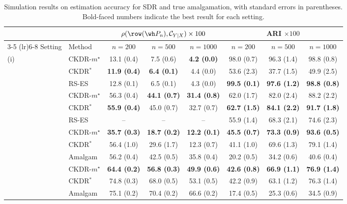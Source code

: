 \begin{table}[t]
    \centering
    \caption{Simulation results on estimation accuracy for SDR and true amalgamation, with standard errors in parentheses. Bold-faced numbers indicate the best result for each setting.}
    \label{tab:simulation-subspace}
    \begin{scriptsize}
    \begin{tabular*}{\columnwidth}{@{\extracolsep{\fill}}llcccccc}
    \toprule
     &  & \multicolumn{3}{c}{$\rho(\row(\wh P_n), \mathcal{C}_{Y|X}) \times 100$} & \multicolumn{3}{c}{ARI $\times 100$} \\
    \cmidrule(lr){3-5} \cmidrule(lr){6-8}
    Setting& Method & $n=200$ & $n=500$ & $n=1000$ & $n=200$ & $n=500$ & $n=1000$ \\
    \midrule
     \multirow{3}{*}{(i)} & CKDR-$m^\star$ & 13.1 (0.4) & 7.5 (0.6) & \textbf{4.2 (0.0)} & 98.0 (0.7) & 96.3 (1.4) & 98.8 (0.8) \\
      & CKDR$^*$ & \textbf{11.9 (0.4)} & \textbf{6.4 (0.1)} & 4.4 (0.0) & 53.6 (2.3) & 37.7 (1.5) & 49.9 (2.5) \\
      & RS-ES & 12.8 (0.1) & 6.5 (0.1) & 4.3 (0.0) & \textbf{99.5 (0.1)} & \textbf{97.6 (1.2)} & \textbf{98.8 (0.8)} \\
    \addlinespace
     \multirow{3}{*}{(ii)} & CKDR-$m^\star$ & 56.3 (0.4) & \textbf{44.1 (0.7)} & \textbf{31.4 (0.8)} & 62.0 (1.7) & 82.0 (2.4) & 88.2 (2.2) \\
      & CKDR$^*$ & \textbf{55.9 (0.4)} & 45.0 (0.7) & 32.7 (0.7) & \textbf{62.7 (1.5)} & \textbf{84.1 (2.2)} & \textbf{91.7 (1.8)} \\
      & RS-ES & -- & -- & -- & 55.9 (1.4) & 68.3 (2.1) & 74.6 (2.3) \\
    \addlinespace
     \multirow{3}{*}{(iii)} & CKDR-$m^\star$ & \textbf{35.7 (0.3)} & \textbf{18.7 (0.2)} & \textbf{12.2 (0.1)} & \textbf{45.5 (0.7)} & \textbf{73.3 (0.9)} & \textbf{93.6 (0.5)} \\
      & CKDR$^*$ & 56.4 (1.0) & 29.6 (1.7) & 12.3 (0.7) & 41.1 (1.0) & 69.6 (1.3) & 79.1 (1.4) \\
      & Amalgam & 56.2 (0.4) & 42.5 (0.5) & 35.8 (0.4) & 20.2 (0.5) & 34.2 (0.6) & 40.6 (0.4) \\
    \addlinespace
     \multirow{3}{*}{(iv)} & CKDR-$m^\star$ & \textbf{64.4 (0.2)} & \textbf{56.8 (0.3)} & \textbf{49.9 (0.6)} & \textbf{42.6 (0.8)} & \textbf{66.9 (1.1)} & \textbf{76.9 (1.4)} \\
      & CKDR$^*$ & 74.8 (0.3) & 68.0 (0.5) & 53.1 (0.5) & 42.2 (0.9) & 63.1 (1.2) & 76.3 (1.4) \\
      & Amalgam & 75.1 (0.2) & 70.4 (0.2) & 66.6 (0.2) & 17.4 (0.5) & 25.3 (0.6) & 34.5 (0.9) \\
    \bottomrule
    \end{tabular*}
    \end{scriptsize}
\end{table}